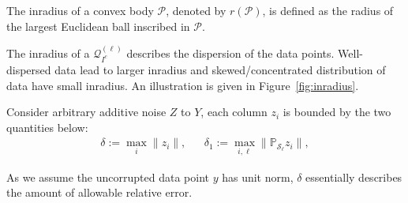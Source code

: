 \documentclass{ctexart}
\begin{document}

\begin{definition}[inradius]
The inradius of a convex body $\mathcal{P}$, denoted by $r(\mathcal{P})$, is defined as the radius of the largest Euclidean ball inscribed in $\mathcal{P}$.
\end{definition}
The inradius of a $\mathcal{Q}_{I^c}^{(\ell)}$ describes the dispersion of the data points. Well-dispersed data lead to larger inradius and skewed/concentrated distribution of data have small inradius. An illustration is given in Figure~\ref{fig:inradius}.


\begin{definition}
Consider arbitrary additive noise $Z$ to $Y$, each column $z_i$ is bounded by the two quantities below:
\begin{align*}
  \delta:= \max_i\|z_i\|, && \delta_1:=\max_{i,\ell}\|\mathbb{P}_\mathcal{S_{\ell}}z_i\|,
\end{align*}
\end{definition}
As we assume the uncorrupted data point $y$ has unit norm, $\delta$ essentially describes the amount of allowable relative error.
\end{document}
